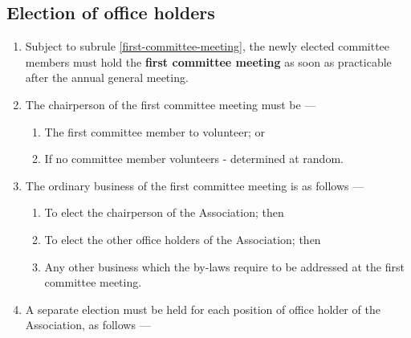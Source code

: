 \documentclass[../constitution.tex]{subfiles}
\begin{document}
\hypertarget{election-of-office-holders}{%
\subsection{Election of office holders}\label{election-of-office-holders}}

\begin{enumerate}

\item Subject to subrule \ref{first-committee-meeting}, the newly elected committee members must hold the \textbf{first committee meeting} as soon as practicable after the annual general meeting.

\item The chairperson of the first committee meeting must be ---

  \begin{enumerate}
  \item The first committee member to volunteer; or
  \item If no committee member volunteers - determined at random.
  \end{enumerate}

\item The ordinary business of the first committee meeting is as follows ---

  \begin{enumerate}
  \item To elect the chairperson of the Association; then
  \item To elect the other office holders of the Association; then
  \item Any other business which the by-laws require to be addressed at the first committee meeting.
  \end{enumerate}




\item A separate election must be held for each position of office holder of the Association, as follows ---


\end{enumerate}
\end{document}
